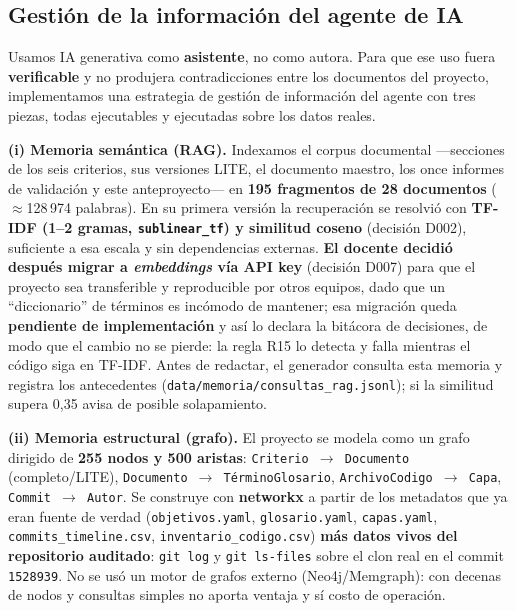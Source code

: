 %     
\subsection{Gestión de la información del agente de IA}

Usamos IA generativa como \textbf{asistente}, no como autora. Para que ese uso
fuera \textbf{verificable} y no produjera contradicciones entre los documentos
del proyecto, implementamos una estrategia de gestión de información del agente
con tres piezas, todas ejecutables y ejecutadas sobre los datos reales.

\textbf{(i) Memoria semántica (RAG).} Indexamos el corpus documental
---secciones de los seis criterios, sus versiones LITE, el documento maestro,
los once informes de validación y este anteproyecto--- en \textbf{195 fragmentos
de 28 documentos} ($\approx$128\,974 palabras). En su primera versión la
recuperación se resolvió con \textbf{TF-IDF (1--2 gramas, \texttt{sublinear\_tf})
y similitud coseno} (decisión D002), suficiente a esa escala y sin dependencias
externas. \textbf{El docente decidió después migrar a \emph{embeddings} vía API
key} (decisión D007) para que el proyecto sea transferible y reproducible por
otros equipos, dado que un ``diccionario'' de términos es incómodo de mantener;
esa migración queda \textbf{pendiente de implementación} y así lo declara la
bitácora de decisiones, de modo que el cambio no se pierde: la regla R15 lo
detecta y falla mientras el código siga en TF-IDF. Antes de redactar, el
generador consulta esta memoria y registra los antecedentes
(\texttt{data/memoria/consultas\_rag.jsonl}); si la similitud supera 0{,}35 avisa
de posible solapamiento.

\textbf{(ii) Memoria estructural (grafo).} El proyecto se modela como un grafo
dirigido de \textbf{255 nodos y 500 aristas}:
\texttt{Criterio\,$\rightarrow$\,Documento} (completo/LITE),
\texttt{Documento\,$\rightarrow$\,T\'erminoGlosario},
\texttt{ArchivoCodigo\,$\rightarrow$\,Capa},
\texttt{Commit\,$\rightarrow$\,Autor}. Se construye con \textbf{networkx} a partir
de los metadatos que ya eran fuente de verdad (\texttt{objetivos.yaml},
\texttt{glosario.yaml}, \texttt{capas.yaml}, \texttt{commits\_timeline.csv},
\texttt{inventario\_codigo.csv}) \textbf{m\'as datos vivos del repositorio
auditado}: \texttt{git log} y \texttt{git ls-files} sobre el clon real en el
commit \texttt{1528939}. No se usó un motor de grafos externo
(Neo4j/Memgraph): con decenas de nodos y consultas simples no aporta ventaja y
sí costo de operación.

